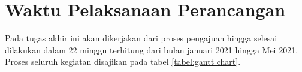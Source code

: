 \section{Waktu Pelaksanaan Perancangan}
Pada tugas akhir ini akan dikerjakan dari proses pengajuan hingga selesai dilakukan dalam 22 minggu terhitung dari bulan januari 2021 hingga Mei 2021. Proses seluruh kegiatan disajikan pada tabel \ref{tabel:gantt chart}.
\begin{table}[h]
	
	\centering
	\caption{Waktu Pelaksanaan Tugas Akhir}
	\label{tabel:gantt chart}
\end{table}
